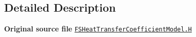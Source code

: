 \subsection{Detailed Description}
{\bfseries Original source file} \href{../../../home/carlo/data/GeN-Foam/GeN-Foam_ffn/GeN-Foam/GeN-Foam/classes/thermalHydraulics/src/physicsModels/heatTransferModels/FSHeatTransferCoefficientModels/FSHeatTransferCoefficientModel.H}{\tt F\+S\+Heat\+Transfer\+Coefficient\+Model.\+H} 